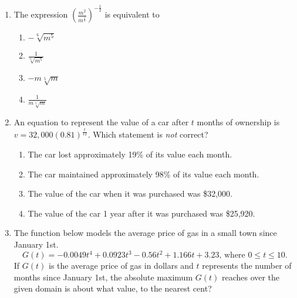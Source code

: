 \documentclass[12pt, twoside]{article}
\begin{document}
\begin{enumerate}
\newpage
\item The expression $\displaystyle \left( \frac{m^2}{m^\frac{1}{3}}\right)^{-\frac{1}{2}}$ is equivalent to
\begin{enumerate}
    \item $-\sqrt[6]{m^5}$
    \item $\displaystyle \frac{1}{\sqrt[6]{m^5}}$
    \item $-m \sqrt[5]{m}$
    \item $\displaystyle \frac{1}{m \sqrt[5]{m}}$ \\[.5in]
\end{enumerate} %


\item An equation to represent the value of a car after $t$ months of ownership is\\ $\displaystyle v=32,000(0.81)^{\frac{t}{12}}$. Which statement is \emph{not} correct?
\begin{enumerate}
    \item The car lost approximately 19\% of its value each month.
    \item The car maintained approximately 98\% of its value each month.
    \item The value of the car when it was purchased was \$32,000.
    \item The value of the car 1 year after it was purchased was \$25,920.
\end{enumerate} %

\item The function below models the average price of gas in a small town since January 1st.
\[G(t)=-0.0049t^4 + 0.0923t^3 - 0.56t^2 +1.166t+3.23 \text{, where } 0 \leq t \leq 10.\]
If $G(t)$ is the average price of gas in dollars and $t$ represents the number of months since January 1st, the absolute maximum $G(t)$ reaches over the given domain is about what value, to the nearest cent? \\[3in] %

\end{enumerate}
\end{document}
